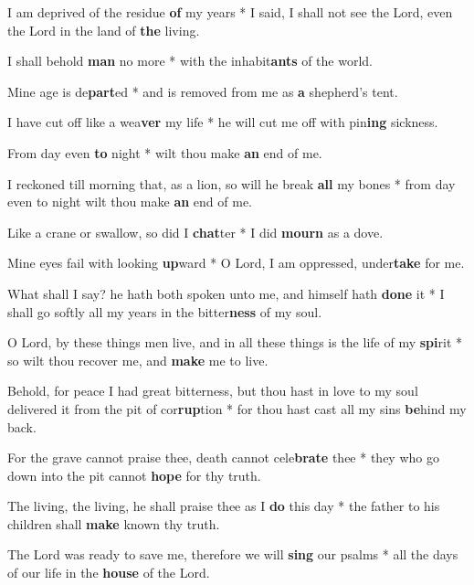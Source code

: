 \begin{multicols}{2}
	I am deprived of the residue \textbf{of} my years * I said, I shall not see the Lord, even the Lord in the land of \textbf{the} living.
	
	I shall behold \textbf{man} no more * with the inhabit\textbf{ants} of the world.
	
	Mine age is de\textbf{part}ed * and is removed from me as \textbf{a} shepherd's tent.
	
	I have cut off like a wea\textbf{ver} my life * he will cut me off with pin\textbf{ing} sickness.
	
	From day even \textbf{to} night * wilt thou make \textbf{an} end of me.
	
	I reckoned till morning that, as a lion, so will he break \textbf{all} my bones * from day even to night wilt thou make \textbf{an} end of me.
	
	Like a crane or swallow, so did I \textbf{chat}ter * I did \textbf{mourn} as a dove.
	
	Mine eyes fail with looking \textbf{up}ward * O Lord, I am oppressed, under\textbf{take} for me.
	
	What shall I say? he hath both spoken unto me, and himself hath \textbf{done} it * I shall go softly all my years in the bitter\textbf{ness} of my soul.
	
	O Lord, by these things men live, and in all these things is the life of my \textbf{spi}rit * so wilt thou recover me, and \textbf{make} me to live.
	
	Behold, for peace I had great bitterness, but thou hast in love to my soul delivered it from the pit of cor\textbf{rup}tion * for thou hast cast all my sins \textbf{be}hind my back.
	
	For the grave cannot praise thee, death cannot cele\textbf{brate} thee * they who go down into the pit cannot \textbf{hope} for thy truth.
	
	The living, the living, he shall praise thee as I \textbf{do} this day * the father to his children shall \textbf{make} known thy truth.
	
	The Lord was ready to save me, therefore we will \textbf{sing} our psalms * all the days of our life in the \textbf{house} of the Lord.
\end{multicols}